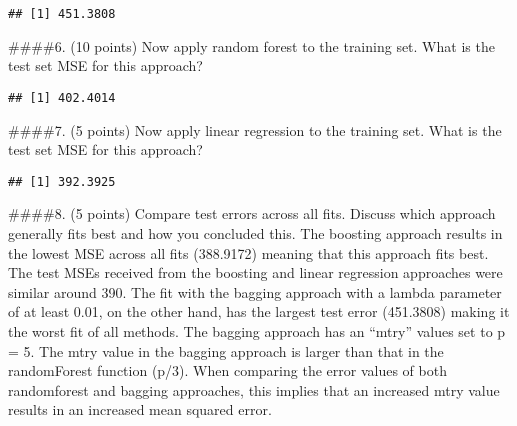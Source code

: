 \documentclass[]{article}
\newenvironment{Shaded}{\begin{snugshade}}{\end{snugshade}}
\newcommand{\DataTypeTok}[1]{\textcolor[rgb]{0.13,0.29,0.53}{#1}}
\newcommand{\KeywordTok}[1]{\textcolor[rgb]{0.13,0.29,0.53}{\textbf{#1}}}
\newcommand{\NormalTok}[1]{#1}
\newcommand{\OperatorTok}[1]{\textcolor[rgb]{0.81,0.36,0.00}{\textbf{#1}}}
\newcommand{\OtherTok}[1]{\textcolor[rgb]{0.56,0.35,0.01}{#1}}
\newcommand{\StringTok}[1]{\textcolor[rgb]{0.31,0.60,0.02}{#1}}
\begin{document}
\begin{verbatim}
## [1] 451.3808
\end{verbatim}

\#\#\#\#6. (10 points) Now apply random forest to the training set. What
is the test set MSE for this approach?

\begin{Shaded}
\end{Shaded}

\begin{verbatim}
## [1] 402.4014
\end{verbatim}

\#\#\#\#7. (5 points) Now apply linear regression to the training set.
What is the test set MSE for this approach?

\begin{Shaded}
\end{Shaded}

\begin{verbatim}
## [1] 392.3925
\end{verbatim}

\#\#\#\#8. (5 points) Compare test errors across all fits. Discuss which
approach generally fits best and how you concluded this. The boosting
approach results in the lowest MSE across all fits (388.9172) meaning
that this approach fits best. The test MSEs received from the boosting
and linear regression approaches were similar around 390. The fit with
the bagging approach with a lambda parameter of at least 0.01, on the
other hand, has the largest test error (451.3808) making it the worst
fit of all methods. The bagging approach has an ``mtry'' values set to p
= 5. The mtry value in the bagging approach is larger than that in the
randomForest function (p/3). When comparing the error values of both
randomforest and bagging approaches, this implies that an increased mtry
value results in an increased mean squared error.
\end{document}
